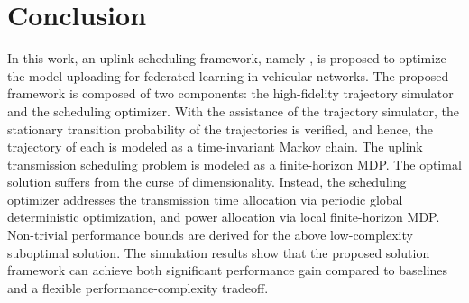 \section{Conclusion}
\label{sec:conclusion}
In this work, an uplink scheduling framework, namely {\fwName}, is proposed to optimize the model uploading for federated learning in vehicular networks.
The proposed {\fwName} framework is composed of two components: the high-fidelity trajectory simulator and the scheduling optimizer.
With the assistance of the trajectory simulator, the stationary transition probability of the trajectories is verified, and hence, the trajectory of each {\IAV} is modeled as a time-invariant Markov chain.
The uplink transmission scheduling problem is modeled as a finite-horizon MDP.
The optimal solution suffers from the curse of dimensionality. Instead, the scheduling optimizer addresses the transmission time allocation via periodic global deterministic optimization, and power allocation via local finite-horizon MDP. Non-trivial performance bounds are derived for the above low-complexity suboptimal solution.
The simulation results show that the proposed solution framework can achieve both significant performance gain  compared to baselines and a flexible performance-complexity tradeoff.
